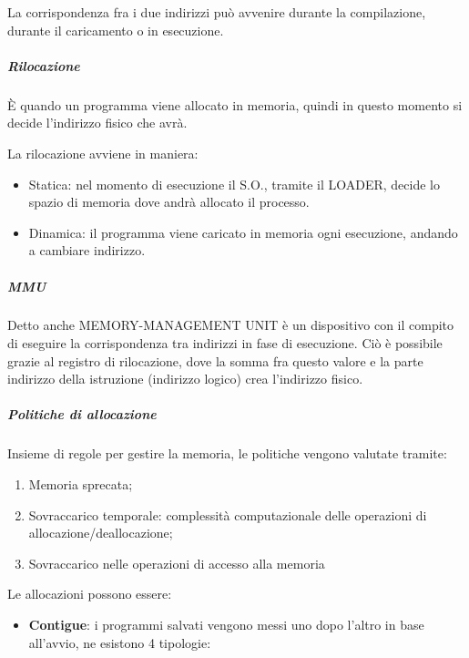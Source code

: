 La corrispondenza fra i due indirizzi può avvenire durante la
compilazione, durante il caricamento o in esecuzione.

\subparagraph{\texorpdfstring{\emph{Rilocazione}}{Rilocazione}}\label{rilocazione}

È quando un programma viene allocato in memoria, quindi in questo
momento si decide l'indirizzo fisico che avrà.

La rilocazione avviene in maniera:

\begin{itemize}
\item
  Statica: nel momento di esecuzione il S.O., tramite il LOADER, decide
  lo spazio di memoria dove andrà allocato il processo.
\item
  Dinamica: il programma viene caricato in memoria ogni esecuzione,
  andando a cambiare indirizzo.
\end{itemize}

\subparagraph{\texorpdfstring{\emph{MMU}}{MMU}}\label{mmu}

Detto anche MEMORY-MANAGEMENT UNIT è un dispositivo con il compito di
eseguire la corrispondenza tra indirizzi in fase di esecuzione. Ciò è
possibile grazie al registro di rilocazione, dove la somma fra questo
valore e la parte indirizzo della istruzione (indirizzo logico) crea
l'indirizzo fisico.

\subparagraph{\texorpdfstring{\emph{Politiche di
allocazione}}{Politiche di allocazione}}\label{politiche-di-allocazione}

Insieme di regole per gestire la memoria, le politiche vengono valutate
tramite:

\begin{enumerate}
\def\labelenumi{\arabic{enumi}.}
\item
  Memoria sprecata;
\item
  Sovraccarico temporale: complessità computazionale delle operazioni di
  allocazione/deallocazione;
\item
  Sovraccarico nelle operazioni di accesso alla memoria
\end{enumerate}

Le allocazioni possono essere:

\begin{itemize}
\item
  \textbf{Contigue}: i programmi salvati vengono messi uno dopo l'altro
  in base all'avvio, ne esistono 4 tipologie:
\end{itemize}

